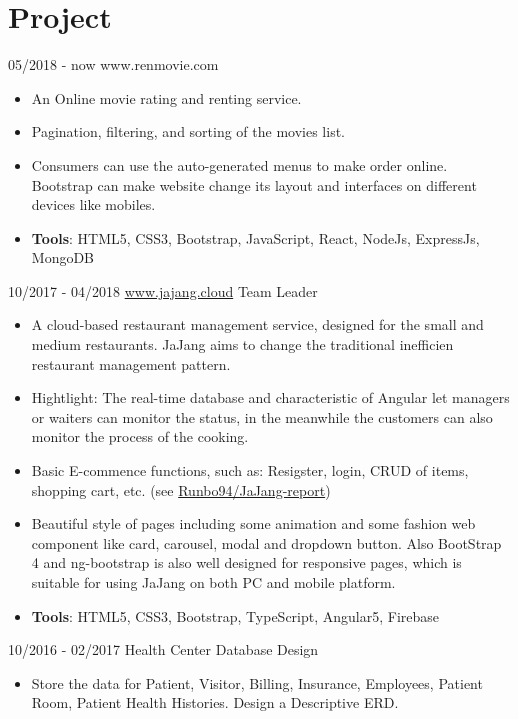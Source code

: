 \documentclass[letterpaper]{twentysecondcv} %
\begin{document}
\section{Project}
\begin{twenty}
	\twentyitem
	{05/2018}
	{- now}
	{www.renmovie.com}
	{}
	{}
	{
		{\begin{itemize}
				\item An Online movie rating and renting service.
				\item Pagination, filtering, and sorting of the movies list.
				\item Consumers can use the auto-generated menus to make order online. Bootstrap can make website change its layout and interfaces on different devices like mobiles.
				\item \textbf{Tools}: HTML5, CSS3, Bootstrap, JavaScript, React, NodeJs, ExpressJs, MongoDB  \vspace{2mm}
		\end{itemize}}
	}
	\twentyitem
	{10/2017}
	{- 04/2018}
	{\href{www.jajang.cloud}{www.jajang.cloud}}
	{}
	{Team Leader}
	{
		{\begin{itemize}
				\item A cloud-based restaurant management service, designed for the small and medium restaurants. JaJang aims to change the traditional inefficien restaurant management pattern.
				\item Hightlight: The real-time database and characteristic of Angular let managers or waiters can monitor the status, in the meanwhile the customers can also monitor the process of the cooking. 
				\item Basic E-commence functions, such as: Resigster, login, CRUD of items, shopping cart, etc. (see \href{https://github.com/Runbo94/JaJang-report}{Runbo94/JaJang-report})
				\item Beautiful style of pages including some animation and some fashion web component like card, carousel, modal and dropdown button. Also BootStrap 4 and ng-bootstrap
				is also well designed for responsive pages, which is suitable for using JaJang on both PC and mobile platform.
				\item \textbf{Tools}: HTML5, CSS3, Bootstrap, TypeScript, Angular5, Firebase \vspace{2mm}
		\end{itemize}}
	}
	\twentyitem
	{10/2016}
	{- 02/2017}
	{Health Center Database Design}
	{}
	{}
	{
		{\begin{itemize}
				\item Store the data for Patient, Visitor, Billing, Insurance, Employees, Patient Room, Patient Health Histories. Design a Descriptive ERD.

\end{itemize}}}
\end{twenty}
\end{document}
